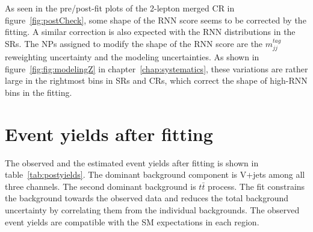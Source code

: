 As seen in the pre/post-fit plots of the 2-lepton merged CR in figure~\ref{fig:postCheck}, some shape of the RNN score seems to be corrected by the fitting.
A similar correction is also expected with the RNN distributions in the SRs.
The NPs assigned to modify the shape of the RNN score are the $m^{tag}_{jj}$ reweighting uncertainty and the modeling uncertainties.
As shown in figure~\ref{fig:fig:modelingZ} in chapter~\ref{chap:systematics}, these variations are rather large in the rightmost bins in SRs and CRs, which correct the shape of high-RNN bins in the fitting.

\section{Event yields after fitting}
\label{sec:eventyields}
The observed and the estimated event yields after fitting is shown in table~\ref{tab:postyields}.
The dominant background component is V+jets among all three channels. 
The second dominant background is $t\bar{t}$ process. 
The fit constrains the background towards the observed data and reduces the total background uncertainty by correlating them from the individual backgrounds.
The observed event yields are compatible with the SM expectations in each region.

